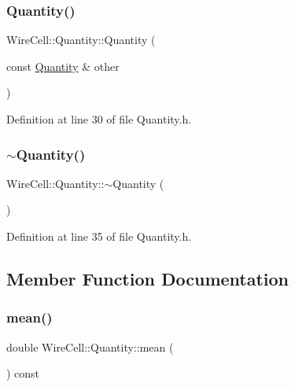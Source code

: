 \subsubsection{\texorpdfstring{Quantity()}{Quantity()}\hspace{0.1cm}{\footnotesize\ttfamily [5/5]}}
{\footnotesize\ttfamily Wire\+Cell\+::\+Quantity\+::\+Quantity (\begin{DoxyParamCaption}\item[{const \hyperlink{class_wire_cell_1_1_quantity}{Quantity} \&}]{other }\end{DoxyParamCaption})\hspace{0.3cm}{\ttfamily [inline]}}



Definition at line 30 of file Quantity.\+h.

\mbox{\label{class_wire_cell_1_1_quantity_a79c2ff3a42cc435ce0dfe93a4100ad4c}} 
\subsubsection{\texorpdfstring{$\sim$\+Quantity()}{~Quantity()}}
{\footnotesize\ttfamily Wire\+Cell\+::\+Quantity\+::$\sim$\+Quantity (\begin{DoxyParamCaption}{ }\end{DoxyParamCaption})\hspace{0.3cm}{\ttfamily [inline]}}



Definition at line 35 of file Quantity.\+h.



\subsection{Member Function Documentation}
\mbox{\label{class_wire_cell_1_1_quantity_a03e883ed20833962578c23ca9e51cd0f}} 
\subsubsection{\texorpdfstring{mean()}{mean()}}
{\footnotesize\ttfamily double Wire\+Cell\+::\+Quantity\+::mean (\begin{DoxyParamCaption}{ }\end{DoxyParamCaption}) const\hspace{0.3cm}{\ttfamily [inline]}}



